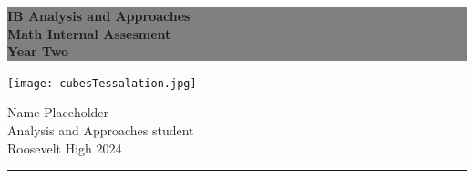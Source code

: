 \begin{titlepage} %
\colorbox{grey}{
	\parbox[t]{0.93\textwidth}{ %
		\parbox[t]{0.91\textwidth}{ %
			\raggedleft %
			\fontsize{20pt}{30pt}\selectfont %
			\vspace{0.7cm} %
			\color{color1}\sffamily\bfseries
			IB Analysis and Approaches\\
			Math Internal Assesment\\
			Year Two\\
			\vspace{0.7cm} %
		}
	}
}
	\vspace{-0.5\baselineskip} %
		\raggedleft %
		\texttt{[image: cubesTessalation.jpg]}
	\vfill %
	\parbox[t]{0.93\textwidth}{ %
		\raggedleft %
		\large %
		{\Large Name Placeholder}\\[4pt] %
		Analysis and Approaches student\\
		Roosevelt High 2024\\[4pt] %
		\hfill\rule{0.2\linewidth}{1pt}%
	}
\end{titlepage}

\maketitle %

